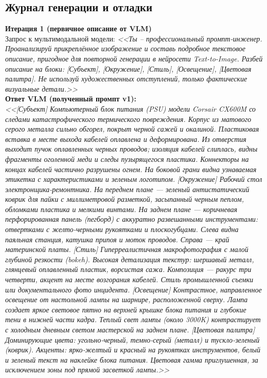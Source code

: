 \subsection{Журнал генерации и отладки}
\textbf{Итерация 1 (первичное описание от VLM)} \\
Запрос к мультимодальной модели: \textit{<<Ты – профессиональный промпт-инженер. Проанализируй прикреплённое изображение и составь подробное текстовое описание, пригодное для повторной генерации в нейросети Text-to-Image. Разбей описание на блоки: [Субъект], [Окружение], [Стиль], [Освещение], [Цветовая палитра]. Не используй художественных отступлений, только фактические визуальные детали.>>} \\
\newline
\indent \textbf{Ответ VLM (полученный промпт v1):} \\
\textit{<<[Субъект]
Компьютерный блок питания (PSU) модели Corsair CX600M со следами катастрофического термического повреждения. Корпус из матового серого металла сильно обгорел, покрыт черной сажей и окалиной. Пластиковая вставка в месте выхода кабелей оплавлена и деформирована. Из отверстия выходит пучок оплавленных черных проводов; изоляция кабелей слиплась, видны фрагменты оголенной меди и следы пузырящегося пластика. Коннекторы на концах кабелей частично разрушены огнем. На боковой грани видна узнаваемая этикетка с характеристиками и зеленым логотипом.
[Окружение]
Рабочий стол электронщика-ремонтника. На переднем плане — зеленый антистатический коврик для пайки с миллиметровой разметкой, засыпанный черным пеплом, обломками пластика и мелкими винтами. На заднем плане — коричневая перфорированная панель (пегборд) с аккуратно развешанными инструментами: отвертками с желто-черными рукоятками и плоскогубцами. Слева видна паяльная станция, катушка припоя и моток проводов. Справа — край материнской платы.
[Стиль]
Гиперреалистичная макрофотография с малой глубиной резкости (bokeh). Высокая детализация текстур: шершавый металл, глянцевый оплавленный пластик, ворсистая сажа. Композиция — ракурс три четверти, акцент на месте возгорания кабелей. Стиль промышленной съемки или документального фото инцидента.
[Освещение]
Контрастное, направленное освещение от настольной лампы на шарнире, расположенной сверху. Лампа создает яркое световое пятно на верхней крышке блока питания и глубокие тени в нижней части кадра. Теплый свет лампы (около 3000K) контрастирует с холодным дневным светом мастерской на заднем плане.
[Цветовая палитра]
Доминирующие цвета: угольно-черный, темно-серый (металл) и тускло-зеленый (коврик). Акценты: ярко-желтый и красный на рукоятках инструментов, белый и зеленый текст на наклейке блока питания. Цветовая гамма приглушенная, за исключением зоны под прямой засветкой лампы.>>}
